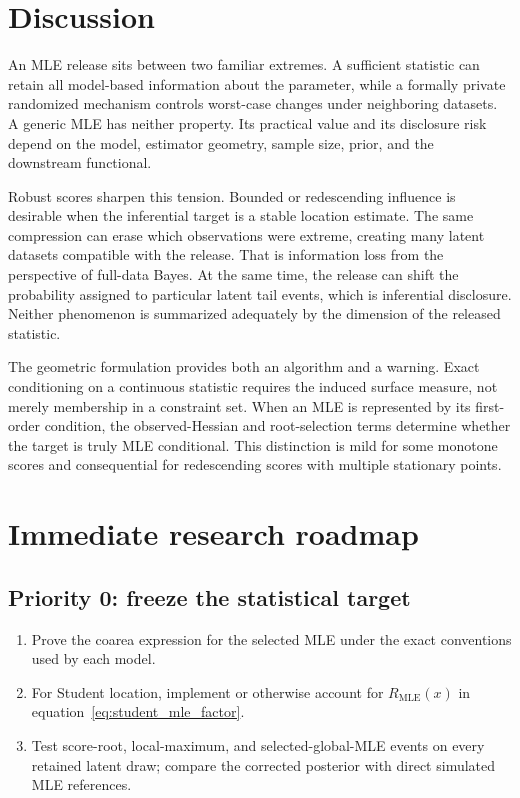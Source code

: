 \documentclass[smallextended,natbib,runningheads]{svjour3}
\begin{document}
\section{Discussion}
\label{sec:discussion}

An MLE release sits between two familiar extremes.  A sufficient statistic can
retain all model-based information about the parameter, while a formally
private randomized mechanism controls worst-case changes under neighboring
datasets.  A generic MLE has neither property.  Its practical value and its
disclosure risk depend on the model, estimator geometry, sample size, prior,
and the downstream functional.

Robust scores sharpen this tension.  Bounded or redescending influence is
desirable when the inferential target is a stable location estimate.  The same
compression can erase which observations were extreme, creating many latent
datasets compatible with the release.  That is information loss from the
perspective of full-data Bayes.  At the same time, the release can shift the
probability assigned to particular latent tail events, which is inferential
disclosure.  Neither phenomenon is summarized adequately by the dimension of
the released statistic.

The geometric formulation provides both an algorithm and a warning.  Exact
conditioning on a continuous statistic requires the induced surface measure,
not merely membership in a constraint set.  When an MLE is represented by its
first-order condition, the observed-Hessian and root-selection terms determine
whether the target is truly MLE conditional.  This distinction is mild for
some monotone scores and consequential for redescending scores with multiple
stationary points.

\section{Immediate research roadmap}
\label{sec:roadmap}

\subsection*{Priority 0: freeze the statistical target}
\begin{enumerate}
  \item Prove the coarea expression for the selected MLE under the exact
  conventions used by each model.
  \item For Student location, implement or otherwise account for
  $R_{\mathrm{MLE}}(x)$ in equation~\eqref{eq:student_mle_factor}.
  \item Test score-root, local-maximum, and selected-global-MLE events on every
  retained latent draw; compare the corrected posterior with direct simulated
  MLE references.
\end{enumerate}
\end{document}
